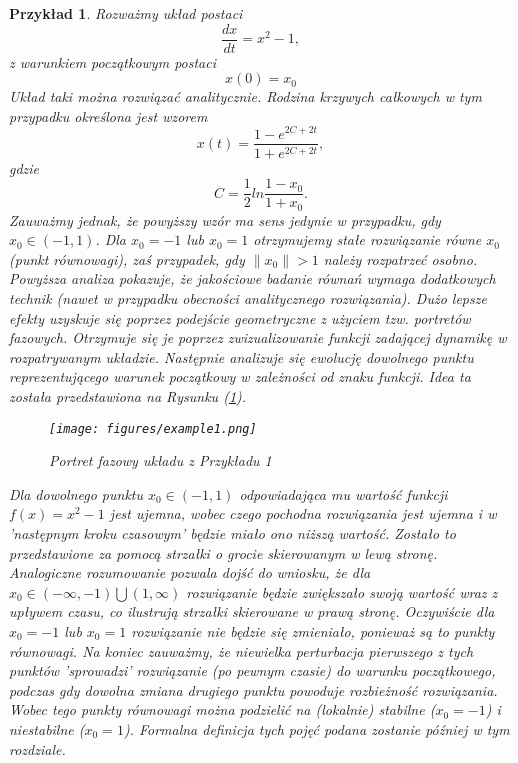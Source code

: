\documentclass[12pt]{article}
\newtheorem{przyklad}{Przykład}
\begin{document}
\begin{przyklad}\label{przyklad1}
	Rozważmy układ postaci
	\begin{equation}
	\frac{dx}{dt} = x^2-1,
	\end{equation}
	z warunkiem początkowym postaci
	\begin{equation}
	x(0) = x_{0}
	\end{equation}
	Układ taki można rozwiązać analitycznie. Rodzina krzywych całkowych w tym przypadku określona jest wzorem
	\begin{equation}
	x(t) = \frac{1 - e^{2C + 2t}}{1 + e^{2C + 2t}},
	\end{equation}
	gdzie
	\begin{equation}
	C = \frac{1}{2}ln\frac{1-x_{0}}{1+x_{0}}.
	\end{equation}	
	Zauważmy jednak, że powyższy wzór ma sens jedynie w przypadku, gdy $ x_{0} \in (-1,1) $. Dla $ x_{0} = -1 $ lub $ x_{0} = 1 $ otrzymujemy stałe rozwiązanie równe $ x_{0} $ (punkt równowagi), zaś przypadek, gdy $ \| {x_{0}}\| > 1 $ należy rozpatrzeć osobno.\newline 
	Powyższa analiza pokazuje, że jakościowe badanie równań wymaga dodatkowych technik (nawet w przypadku obecności analitycznego rozwiązania). Dużo lepsze efekty uzyskuje się poprzez podejście geometryczne z użyciem tzw. \textit{portretów fazowych}. Otrzymuje się je poprzez zwizualizowanie funkcji zadającej dynamikę w rozpatrywanym układzie. Następnie analizuje się ewolucję dowolnego punktu reprezentującego warunek początkowy w zależności od znaku funkcji. Idea ta została przedstawiona na Rysunku (\ref{Fig4}).
	\begin{figure}[H]
		\texttt{[image: figures/example1.png]} 
		\centering
		\caption{Portret fazowy układu z Przykładu 1}
		\label{Fig4}
	\end{figure}
	Dla dowolnego punktu $ x_{0} \in (-1,1) $ odpowiadająca mu wartość funkcji $ f(x) = x^2-1 $ jest ujemna, wobec czego pochodna rozwiązania jest ujemna i w 'następnym kroku czasowym' będzie miało ono niższą wartość. Zostało to przedstawione za pomocą strzałki o grocie skierowanym w lewą stronę. Analogiczne rozumowanie pozwala dojść do wniosku, że dla $ x_{0} \in (-\infty,-1) \bigcup (1,\infty)$ rozwiązanie będzie zwiększało swoją wartość wraz z upływem czasu, co ilustrują strzałki skierowane w prawą stronę. Oczywiście dla  $ x_{0} = -1 $ lub $ x_{0} = 1 $ rozwiązanie nie będzie się zmieniało, ponieważ są to punkty równowagi. Na koniec zauważmy, że niewielka perturbacja pierwszego z tych punktów 'sprowadzi' rozwiązanie (po pewnym czasie) do warunku początkowego, podczas gdy dowolna zmiana drugiego punktu powoduje rozbieżność rozwiązania. Wobec tego punkty równowagi można podzielić na (lokalnie) stabilne ($ x_{0} = -1 $) i niestabilne ($ x_{0} = 1 $). Formalna definicja tych pojęć podana zostanie później w tym rozdziale.
\end{przyklad}
\end{document}
